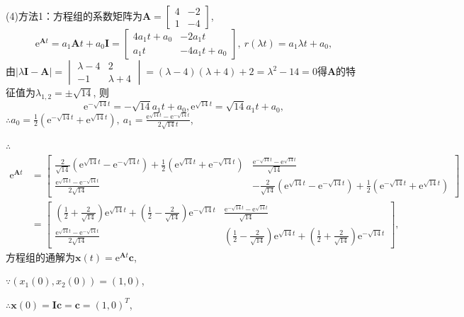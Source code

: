 \documentclass[12pt,UTF8]{ctexart}
\newcommand{\me}[0]{\mathrm e}
\begin{document}
\begin{enumerate}
(4)方法1：方程组的系数矩阵为$\bm A=\begin{bmatrix}4&-2\\1&-4\end{bmatrix}$,
\[\me^{\bm At}=a_1\bm At+a_0\bm I=\begin{bmatrix}4a_1t+a_0&-2a_1t\\a_1t&-4a_1t+a_0\end{bmatrix},\ r(\lambda t)=a_1\lambda t+a_0,\]
由$|\lambda\bm I-\bm A|=\begin{vmatrix}\lambda-4&2\\-1&\lambda+4\end{vmatrix}=(\lambda-4)(\lambda+4)+2=\lambda^2-14=0$得$\bm A$的特征值为$\lambda_{1,2}=\pm\sqrt{14}$, 则
\[\me^{-\sqrt{14}t}=-\sqrt{14}a_1t+a_0,\me^{\sqrt{14}t}=\sqrt{14}a_1t+a_0,\]
$\therefore a_0=\frac12(\me^{-\sqrt{14}t}+\me^{\sqrt{14}t}),\ a_1=\frac{\me^{\sqrt{14}t}-\me^{-\sqrt{14}t}}{2\sqrt{14}t}$,

$\therefore$
\[\begin{aligned}
\me^{\bm At}&=\begin{bmatrix}\frac2{\sqrt{14}}(\me^{\sqrt{14}t}-\me^{-\sqrt{14}t})+\frac12(\me^{\sqrt{14}t}+\me^{-\sqrt{14}t})&\frac{\me^{-\sqrt{14}t}-\me^{\sqrt{14}t}}{\sqrt{14}}\\
\frac{\me^{\sqrt{14}t}-\me^{-\sqrt{14}t}}{2\sqrt{14}}&-\frac2{\sqrt{14}}(\me^{\sqrt{14}t}-\me^{-\sqrt{14}t})+\frac12(\me^{-\sqrt{14}t}+\me^{\sqrt{14}t})\end{bmatrix}\\
&=\begin{bmatrix}
(\frac12+\frac2{\sqrt{14}})\me^{\sqrt{14}t}+(\frac12-\frac2{\sqrt{14}})\me^{-\sqrt{14}t}&\frac{\me^{-\sqrt{14}t}-\me^{\sqrt{14}t}}{\sqrt{14}}\\
\frac{\me^{\sqrt{14}t}-\me^{-\sqrt{14}t}}{2\sqrt{14}}&(\frac12-\frac2{\sqrt{14}})\me^{\sqrt{14}t}+(\frac12+\frac2{\sqrt{14}})\me^{-\sqrt{14}t}
\end{bmatrix},
\end{aligned}\]
方程组的通解为$\bm x(t)=\me^{\bm At}\bm c$,

$\because(x_1(0),x_2(0))=(1,0)$,

$\therefore\bm x(0)=\bm I\bm c=\bm c=(1,0)^T$,


\end{enumerate}
\end{document}
